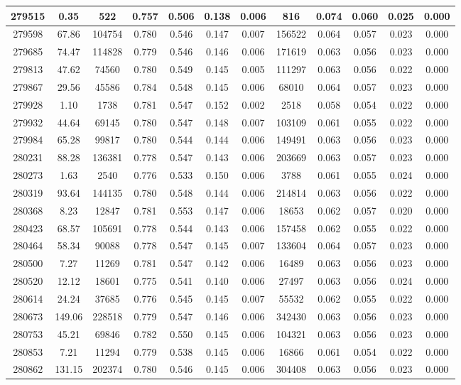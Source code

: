 \documentclass[10pt]{extarticle}
\begin{document}
\begin{longtable}{|c|c|c|c|c|c|c|c|c|c|c|c|}
\hline 
279515&0.35&522&0.757&0.506&0.138&0.006&816&0.074&0.060&0.025&0.000 \\ 
\hline 
279598&67.86&104754&0.780&0.546&0.147&0.007&156522&0.064&0.057&0.023&0.000 \\ 
\hline 
279685&74.47&114828&0.779&0.546&0.146&0.006&171619&0.063&0.056&0.023&0.000 \\ 
\hline 
279813&47.62&74560&0.780&0.549&0.145&0.005&111297&0.063&0.056&0.022&0.000 \\ 
\hline 
279867&29.56&45586&0.784&0.548&0.145&0.006&68010&0.064&0.057&0.023&0.000 \\ 
\hline 
279928&1.10&1738&0.781&0.547&0.152&0.002&2518&0.058&0.054&0.022&0.000 \\ 
\hline 
279932&44.64&69145&0.780&0.547&0.148&0.007&103109&0.061&0.055&0.022&0.000 \\ 
\hline 
279984&65.28&99817&0.780&0.544&0.144&0.006&149491&0.063&0.056&0.023&0.000 \\ 
\hline 
280231&88.28&136381&0.778&0.547&0.143&0.006&203669&0.063&0.057&0.023&0.000 \\ 
\hline 
280273&1.63&2540&0.776&0.533&0.150&0.006&3788&0.061&0.055&0.024&0.000 \\ 
\hline 
280319&93.64&144135&0.780&0.548&0.144&0.006&214814&0.063&0.056&0.022&0.000 \\ 
\hline 
280368&8.23&12847&0.781&0.553&0.147&0.006&18653&0.062&0.057&0.020&0.000 \\ 
\hline 
280423&68.57&105691&0.778&0.544&0.143&0.006&157458&0.062&0.055&0.022&0.000 \\ 
\hline 
280464&58.34&90088&0.778&0.547&0.145&0.007&133604&0.064&0.057&0.023&0.000 \\ 
\hline 
280500&7.27&11269&0.781&0.547&0.142&0.006&16489&0.063&0.056&0.023&0.000 \\ 
\hline 
280520&12.12&18601&0.775&0.541&0.140&0.006&27497&0.063&0.056&0.024&0.000 \\ 
\hline 
280614&24.24&37685&0.776&0.545&0.145&0.007&55532&0.062&0.055&0.022&0.000 \\ 
\hline 
280673&149.06&228518&0.779&0.547&0.146&0.006&342430&0.063&0.056&0.023&0.000 \\ 
\hline 
280753&45.21&69846&0.782&0.550&0.145&0.006&104321&0.063&0.056&0.023&0.000 \\ 
\hline 
280853&7.21&11294&0.779&0.538&0.145&0.006&16866&0.061&0.054&0.022&0.000 \\ 
\hline 
280862&131.15&202374&0.780&0.546&0.145&0.006&304408&0.063&0.056&0.023&0.000 \\ 

\end{longtable}
\end{document}
